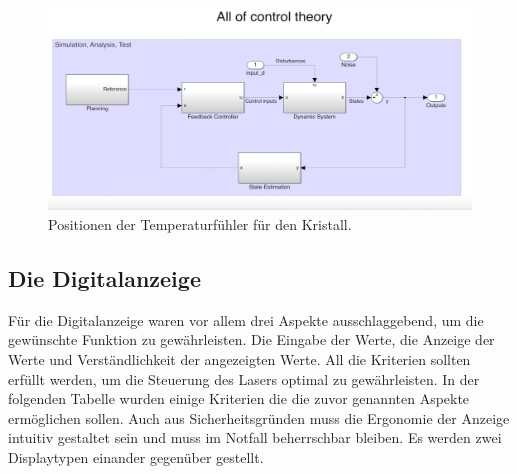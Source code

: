 \begin{figure}[H]
    \centering
    \includegraphics[scale=0.2]{98_images/all_control_theory.PNG}
    \caption{Positionen der Temperaturfühler für den Kristall.}
    \label{fig:temp_measurement_hw_2}
\end{figure}
% 

\subsection{Die Digitalanzeige}
Für die Digitalanzeige waren vor allem drei Aspekte ausschlaggebend, um die gewünschte Funktion zu gewährleisten. Die Eingabe der Werte, die Anzeige der Werte und Verständlichkeit der angezeigten Werte. All die Kriterien sollten erfüllt werden, um die Steuerung des Lasers optimal zu gewährleisten. In der folgenden Tabelle wurden einige Kriterien die die zuvor genannten Aspekte ermöglichen sollen. Auch aus Sicherheitsgründen muss die Ergonomie der Anzeige intuitiv gestaltet sein und muss im Notfall beherrschbar bleiben. Es werden zwei Displaytypen einander gegenüber gestellt.

